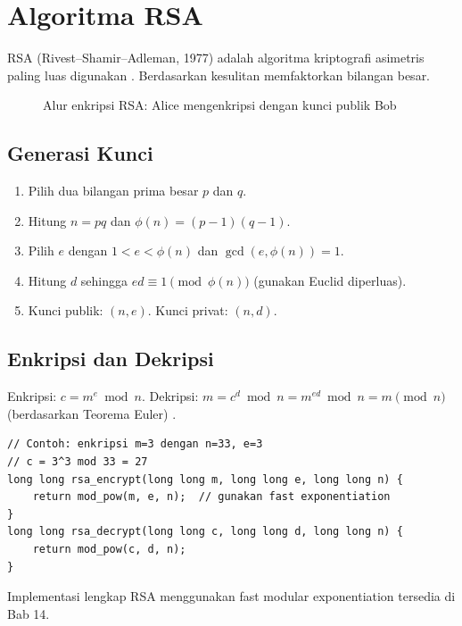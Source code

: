 \section{Algoritma RSA}

RSA (Rivest--Shamir--Adleman, 1977) adalah algoritma kriptografi asimetris paling luas digunakan \cite{rivest1978,katz2020,menezes1996}. Berdasarkan kesulitan memfaktorkan bilangan besar.

\begin{figure}[!htbp]
\centering
{}
\caption{Alur enkripsi RSA: Alice mengenkripsi dengan kunci publik Bob}
\label{fig:rsa}
\end{figure}

\subsection{Generasi Kunci}
\begin{enumerate}
\item Pilih dua bilangan prima besar $p$ dan $q$.
\item Hitung $n = pq$ dan $\phi(n) = (p-1)(q-1)$.
\item Pilih $e$ dengan $1 < e < \phi(n)$ dan $\gcd(e, \phi(n)) = 1$.
\item Hitung $d$ sehingga $ed \equiv 1 \pmod{\phi(n)}$ (gunakan Euclid diperluas).
\item Kunci publik: $(n, e)$. Kunci privat: $(n, d)$.
\end{enumerate}

\subsection{Enkripsi dan Dekripsi}
Enkripsi: $c = m^e \bmod n$. Dekripsi: $m = c^d \bmod n = m^{ed} \bmod n = m \pmod{n}$ (berdasarkan Teorema Euler) \cite{rivest1978,katz2020,menezes1996}.

\begin{lstlisting}[style=cstyle,caption={Enkripsi RSA dalam C (simplified)}]
// Contoh: enkripsi m=3 dengan n=33, e=3
// c = 3^3 mod 33 = 27
long long rsa_encrypt(long long m, long long e, long long n) {
    return mod_pow(m, e, n);  // gunakan fast exponentiation
}
long long rsa_decrypt(long long c, long long d, long long n) {
    return mod_pow(c, d, n);
}
\end{lstlisting}

Implementasi lengkap RSA menggunakan fast modular exponentiation tersedia di Bab 14.
